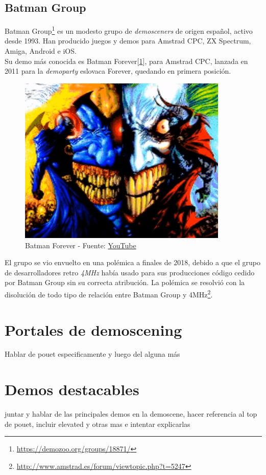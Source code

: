 \subsection{Batman Group}

Batman Group\footnote{\url{https://demozoo.org/groups/18871/}} es un modesto grupo de \emph{demosceners} de origen español, activo desde 1993. Han producido juegos y demos para Amstrad CPC, ZX Spectrum, Amiga, Android e iOS.\\

Su demo más conocida es Batman Forever[\ref{fig:batmanforever}], para Amstrad CPC, lanzada en 2011 para la \emph{demoparty} eslovaca Forever, quedando en primera posición.\\

\begin{figure}[h]
	\centering
	\includegraphics[width=10cm]{archivos/batmanforever}
	\caption{Batman Forever - Fuente: \href{https://www.youtube.com/watch?v=dqjZNnjNu3Y}{YouTube}}
	\label{fig:batmanforever}
\end{figure}

El grupo se vio envuelto en una polémica a finales de 2018, debido a que el grupo de desarrolladores retro \emph{4MHz} había usado para sus producciones código cedido por Batman Group sin su correcta atribución. La polémica se resolvió con la disolución de todo tipo de relación entre Batman Group y 4MHz\footnote{\url{http://www.amstrad.es/forum/viewtopic.php?t=5247}}.

\section{Portales de demoscening}
Hablar de pouet especificamente y luego del alguna más

\section{Demos destacables}
juntar y hablar de las principales demos en la demoscene, hacer referencia al top de pouet, incluir elevated y otras mas e intentar explicarlas

